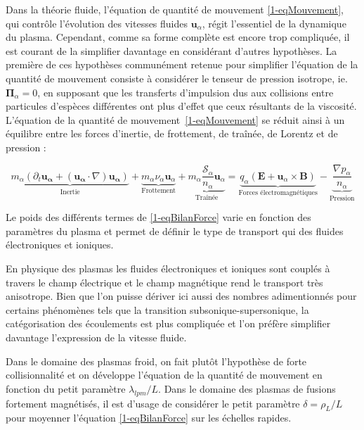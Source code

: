 \begin{refsection}
Dans la théorie fluide, l'équation de quantité de
mouvement \eqref{1-eqMouvement}, qui contrôle l'évolution des vitesses fluides
$\mathbf u_\alpha$, régit l'essentiel de la dynamique du plasma. Cependant, comme sa forme complète
 est encore trop compliquée, il est courant de la
simplifier davantage en considérant d'autres hypothèses.
La première de ces hypothèses communément retenue pour simplifier l'équation de
la quantité de mouvement consiste à considérer le tenseur de pression isotrope,
ie.
$\boldsymbol{\Pi}_\alpha=0$, en supposant que les transferts d'impulsion dus
aux collisions entre particules d'espèces différentes ont plus d'effet que
ceux résultants de la viscosité. L'équation de la quantité de
mouvement~\eqref{1-eqMouvement} se réduit ainsi à un équilibre entre les forces
d'inertie, de frottement, de traînée, de Lorentz et de pression :

\begin{equation}
\label{1-eqBilanForce}
\underbrace{m_\alpha \left(\partial_t \mathbf{u_\alpha} +
(\mathbf{u_\alpha}\cdot\nabla)\mathbf{u_\alpha}\right)}_\text{Inertie}
+\underbrace{m_\alpha\nu_\alpha\mathbf
u_\alpha}_\text{Frottement}+\underbrace{m_\alpha
\frac{\mathcal S_\alpha}{n_\alpha}\mathbf
u_\alpha}_\text{Traînée}=\underbrace{{q_\alpha}\left(\mathbf
E+\mathbf u_\alpha\times \mathbf B\right)}_\text{Forces électromagnétiques}
-\underbrace{\frac{\nabla p_\alpha}{n_\alpha}}_\text{Pression}
\end{equation}
 
Le poids des différents termes de \eqref{1-eqBilanForce} varie en fonction des
paramètres du plasma et permet de définir le type de transport qui des fluides
électroniques et ioniques.

En physique des plasmas les fluides électroniques et ioniques sont couplés à
travers le champ électrique et le champ magnétique rend le transport très
anisotrope. Bien que l'on puisse dériver ici aussi des nombres
adimentionnés pour certains phénomènes tels que la transition
subsonique-supersonique, la catégorisation des écoulements est plus compliquée
et l'on préfère simplifier davantage l'expression de la vitesse fluide.

Dans le domaine des plasmas
froid, on fait plutôt l'hypothèse de forte collisionnalité et on développe
l'équation de la quantité de mouvement en fonction du petit paramètre
$\lambda_{lpm}/L$.
Dans le domaine des plasmas de fusions fortement magnétisés, il est d'usage de
considérer le petit paramètre $\delta=\rho_L/L$ pour moyenner l'équation
\eqref{1-eqBilanForce} sur les échelles rapides. 


\end{refsection}
